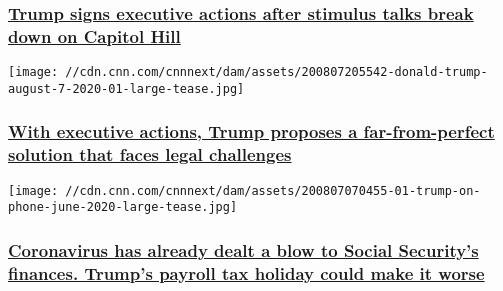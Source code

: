 \hypertarget{trump-signs-executive-actions-after-stimulus-talks-break-down-on-capitol-hill-}{%
\subsubsection{\texorpdfstring{\href{/2020/08/08/politics/trump-executive-order-stimulus/index.html}{Trump
signs executive actions after stimulus talks break down on Capitol Hill
}}{Trump signs executive actions after stimulus talks break down on Capitol Hill }}\label{trump-signs-executive-actions-after-stimulus-talks-break-down-on-capitol-hill-}}

\href{/2020/08/08/politics/trump-democrats-stimulus-talks-stalled/index.html}{}

\texttt{[image: //cdn.cnn.com/cnnnext/dam/assets/200807205542-donald-trump-august-7-2020-01-large-tease.jpg]}

\hypertarget{with-executive-actions-trump-proposes-a-far-from-perfect-solution-that-faces-legal-challenges}{%
\subsubsection{\texorpdfstring{\href{/2020/08/08/politics/trump-democrats-stimulus-talks-stalled/index.html}{With
executive actions, Trump proposes a far-from-perfect solution that faces
legal
challenges}}{With executive actions, Trump proposes a far-from-perfect solution that faces legal challenges}}\label{with-executive-actions-trump-proposes-a-far-from-perfect-solution-that-faces-legal-challenges}}

\href{/2020/08/07/politics/social-security-medicare-trump-payroll-taxes/index.html}{}

\texttt{[image: //cdn.cnn.com/cnnnext/dam/assets/200807070455-01-trump-on-phone-june-2020-large-tease.jpg]}

\hypertarget{coronavirus-has-already-dealt-a-blow-to-social-securitys-finances-trumps-payroll-tax-holiday-could-make-it-worse}{%
\subsubsection{\texorpdfstring{\href{/2020/08/07/politics/social-security-medicare-trump-payroll-taxes/index.html}{Coronavirus
has already dealt a blow to Social Security's finances. Trump's payroll
tax holiday could make it
worse}}{Coronavirus has already dealt a blow to Social Security's finances. Trump's payroll tax holiday could make it worse}}\label{coronavirus-has-already-dealt-a-blow-to-social-securitys-finances-trumps-payroll-tax-holiday-could-make-it-worse}}

